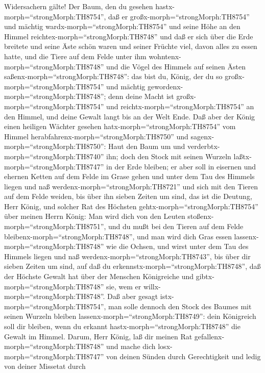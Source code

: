 Widersachern gälte!  Der Baum, den du gesehen
hastx-morph=``strongMorph:TH8754'', daß er
großx-morph=``strongMorph:TH8754'' und mächtig
wardx-morph=``strongMorph:TH8754'' und seine Höhe an den Himmel
reichtex-morph=``strongMorph:TH8748'' und daß er sich über die Erde
breitete  und seine Äste schön waren und seiner Früchte
viel, davon alles zu essen hatte, und die Tiere auf dem Felde unter ihm
wohntenx-morph=``strongMorph:TH8748'' und die Vögel des Himmels auf
seinen Ästen saßenx-morph=``strongMorph:TH8748'':  das bist
du, König, der du so großx-morph=``strongMorph:TH8754'' und mächtig
gewordenx-morph=``strongMorph:TH8748''; denn deine Macht ist
großx-morph=``strongMorph:TH8754'' und
reichtx-morph=``strongMorph:TH8754'' an den Himmel, und deine Gewalt
langt bis an der Welt Ende.  Daß aber der König einen
heiligen Wächter gesehen hatx-morph=``strongMorph:TH8754'' vom Himmel
herabfahrenx-morph=``strongMorph:TH8750'' und
sagenx-morph=``strongMorph:TH8750'': Haut den Baum um und
verderbtx-morph=``strongMorph:TH8740'' ihn; doch den Stock mit seinen
Wurzeln laßtx-morph=``strongMorph:TH8747'' in der Erde bleiben; er aber
soll in eisernen und ehernen Ketten auf dem Felde im Grase gehen und
unter dem Tau des Himmels liegen und naß
werdenx-morph=``strongMorph:TH8721'' und sich mit den Tieren auf dem
Felde weiden, bis über ihn sieben Zeiten um sind,  das ist
die Deutung, Herr König, und solcher Rat des Höchsten
gehtx-morph=``strongMorph:TH8754'' über meinen Herrn König:
 Man wird dich von den Leuten
stoßenx-morph=``strongMorph:TH8751'', und du mußt bei den Tieren auf dem
Felde bleibenx-morph=``strongMorph:TH8748'', und man wird dich Gras
essen lassenx-morph=``strongMorph:TH8748'' wie die Ochsen, und wirst
unter dem Tau des Himmels liegen und naß
werdenx-morph=``strongMorph:TH8743'', bis über dir sieben Zeiten um
sind, auf daß du erkennstx-morph=``strongMorph:TH8748'', daß der Höchste
Gewalt hat über der Menschen Königreiche und
gibtx-morph=``strongMorph:TH8748'' sie, wem er
willx-morph=``strongMorph:TH8748''.  Daß aber gesagt
istx-morph=``strongMorph:TH8754'', man solle dennoch den Stock des
Baumes mit seinen Wurzeln bleiben lassenx-morph=``strongMorph:TH8749'':
dein Königreich soll dir bleiben, wenn du erkannt
hastx-morph=``strongMorph:TH8748'' die Gewalt im Himmel. 
Darum, Herr König, laß dir meinen Rat
gefallenx-morph=``strongMorph:TH8748'' und mache dich
losx-morph=``strongMorph:TH8747'' von deinen Sünden durch Gerechtigkeit
und ledig von deiner Missetat durch
